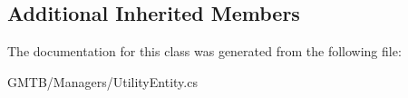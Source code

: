 \subsection*{Additional Inherited Members}


The documentation for this class was generated from the following file\+:\begin{DoxyCompactItemize}
\item 
G\+M\+T\+B/\+Managers/Utility\+Entity.\+cs\end{DoxyCompactItemize}

